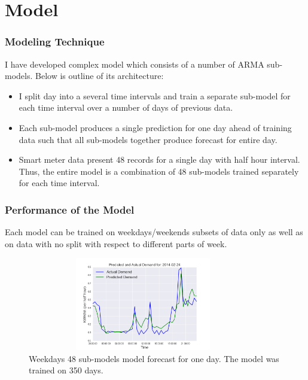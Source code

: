 \documentclass{beamer}
\begin{document}
\section{Model}
\begin{frame}
\frametitle{Modeling Technique}
I have developed complex model which consists of a number of ARMA sub-models. Below is outline of its architecture:
\\
\begin{itemize}
\item I split day into a several time intervals and train a separate sub-model for each time interval over a number of days of previous data.
\item Each sub-model produces a single prediction for one day ahead of training data such that all sub-models together produce forecast for entire day.
\item Smart meter data present 48 records for a single day with half hour interval. Thus, the entire model is a combination of 48 sub-models trained separately for each time interval.
\end{itemize}
\end{frame}

\begin{frame}
\frametitle{Performance of the Model}
Each model can be trained on weekdays/weekends subsets of data only as well as on data with no split with respect to different parts of week.
\begin{figure}[htb]
\begin{center}
    \includegraphics[height=1.6in, width=0.9\textwidth]{../img/fig2a.png}

    \caption{Weekdays 48 sub-models model forecast for one day. The model was trained on 350 days.}

    \label{fig:MAC000002_Model48weekdays}
    \end{center}
\end{figure}

\end{frame}
\end{document}
